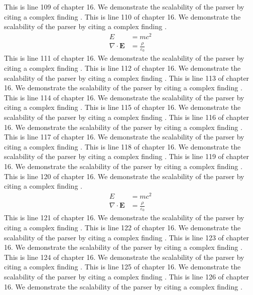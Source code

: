 This is line 109 of chapter 16. We demonstrate the scalability of the parser by citing a complex finding \cite{ref16_109}.
This is line 110 of chapter 16. We demonstrate the scalability of the parser by citing a complex finding \cite{ref16_110}.
\begin{align*}
  E &= mc^2 \\
  \nabla \cdot \mathbf{E} &= \frac{\rho}{\varepsilon_0}
\end{align*}
This is line 111 of chapter 16. We demonstrate the scalability of the parser by citing a complex finding \cite{ref16_111}.
This is line 112 of chapter 16. We demonstrate the scalability of the parser by citing a complex finding \cite{ref16_112}.
This is line 113 of chapter 16. We demonstrate the scalability of the parser by citing a complex finding \cite{ref16_113}.
This is line 114 of chapter 16. We demonstrate the scalability of the parser by citing a complex finding \cite{ref16_114}.
This is line 115 of chapter 16. We demonstrate the scalability of the parser by citing a complex finding \cite{ref16_115}.
This is line 116 of chapter 16. We demonstrate the scalability of the parser by citing a complex finding \cite{ref16_116}.
This is line 117 of chapter 16. We demonstrate the scalability of the parser by citing a complex finding \cite{ref16_117}.
This is line 118 of chapter 16. We demonstrate the scalability of the parser by citing a complex finding \cite{ref16_118}.
This is line 119 of chapter 16. We demonstrate the scalability of the parser by citing a complex finding \cite{ref16_119}.
This is line 120 of chapter 16. We demonstrate the scalability of the parser by citing a complex finding \cite{ref16_120}.
\begin{align*}
  E &= mc^2 \\
  \nabla \cdot \mathbf{E} &= \frac{\rho}{\varepsilon_0}
\end{align*}
This is line 121 of chapter 16. We demonstrate the scalability of the parser by citing a complex finding \cite{ref16_121}.
This is line 122 of chapter 16. We demonstrate the scalability of the parser by citing a complex finding \cite{ref16_122}.
This is line 123 of chapter 16. We demonstrate the scalability of the parser by citing a complex finding \cite{ref16_123}.
This is line 124 of chapter 16. We demonstrate the scalability of the parser by citing a complex finding \cite{ref16_124}.
This is line 125 of chapter 16. We demonstrate the scalability of the parser by citing a complex finding \cite{ref16_125}.
This is line 126 of chapter 16. We demonstrate the scalability of the parser by citing a complex finding \cite{ref16_126}.
